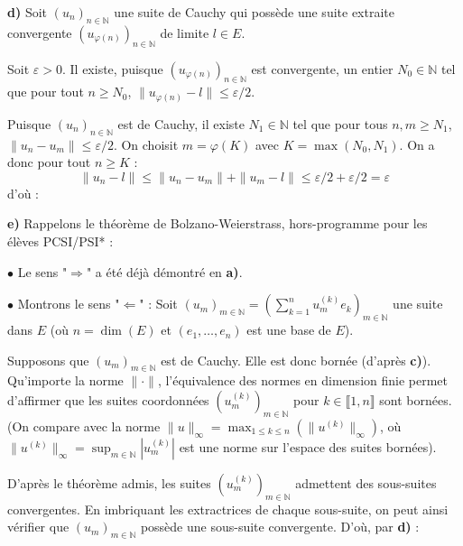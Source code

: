 \documentclass[11pt,a4paper]{report}
\begin{document}
\vspace{0.5cm}

\noindent \textbf{d)} Soit $(u_n)_{n \in \mathbb{N}}$ une suite de Cauchy qui possède une suite extraite convergente $(u_{\varphi(n)})_{n \in \mathbb{N}}$ de limite $l \in E$.

\noindent Soit $\varepsilon > 0$. Il existe, puisque $(u_{\varphi(n)})_{n \in \mathbb{N}}$ est convergente, un entier $N_0 \in \mathbb{N}$ tel que pour tout $n \geqslant N_0$, $\|u_{\varphi(n)} - l\| \leqslant \varepsilon/2$.

\noindent Puisque $(u_n)_{n \in \mathbb{N}}$ est de Cauchy, il existe $N_1 \in \mathbb{N}$ tel que pour tous $n,m \geqslant N_1$, $\|u_n - u_m\| \leqslant \varepsilon/2$. On choisit $m = \varphi(K)$ avec $K = \max(N_0,N_1)$. On a donc pour tout $n \geqslant K$ :
$$ \|u_n - l\| \leqslant \|u_n - u_m\| + \|u_m - l\| \leqslant \varepsilon/2 + \varepsilon/2 = \varepsilon $$
\noindent d'où :
\begin{center}
\end{center}

\vspace{0.5cm}

\noindent \textbf{e)} Rappelons le théorème de Bolzano-Weierstrass, hors-programme pour les élèves PCSI/PSI* :
\begin{center}
\end{center}

\noindent $\bullet$ Le sens "$\Rightarrow$" a été déjà démontré en \textbf{a)}.

\noindent $\bullet$ Montrons le sens "$\Leftarrow$" : Soit $(u_m)_{m \in \mathbb{N}} = \left( \sum_{k=1}^n u_m^{(k)} e_k \right)_{m \in \mathbb{N}}$ une suite dans $E$ (où $n = \dim(E)$ et $(e_1, \ldots, e_n)$ est une base de $E$).

\noindent Supposons que $(u_m)_{m \in \mathbb{N}}$ est de Cauchy. Elle est donc bornée (d'après \textbf{c)}). Qu'importe la norme $\|\cdot\|$, l'équivalence des normes en dimension finie permet d'affirmer que les suites coordonnées $(u_m^{(k)})_{m \in \mathbb{N}}$ pour $k \in \llbracket 1, n \rrbracket$ sont bornées. (On compare avec la norme $\|u\|_\infty = \max_{1 \leqslant k \leqslant n} (\|u^{(k)}\|_\infty)$, où $\|u^{(k)}\|_\infty = \sup_{m \in \mathbb{N}} |u_m^{(k)}|$ est une norme sur l'espace des suites bornées).

\noindent D'après le théorème admis, les suites $(u_m^{(k)})_{m \in \mathbb{N}}$ admettent des sous-suites convergentes. En imbriquant les extractrices de chaque sous-suite, on peut ainsi vérifier que $(u_m)_{m \in \mathbb{N}}$ possède une sous-suite convergente. D'où, par \textbf{d)} :
\begin{center}
\end{center} 
\end{document}
